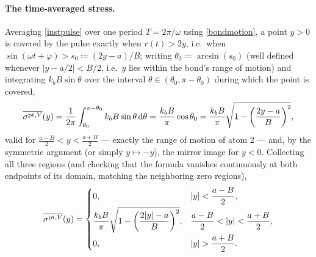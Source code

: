 \paragraph{The time-averaged stress.} Averaging \eqref{instpulse} over one period $T=2\pi/\omega$ using \eqref{bondmotion}, a point $y>0$ is covered by the pulse exactly when $r(t)>2y$, i.e.\ when $\sin(\omega t+\varphi)>s_0\coloneqq(2y-a)/B$; writing $\theta_0\coloneqq\arcsin(s_0)$ (well defined whenever $|y-a/2|<B/2$, i.e.\ $y$ lies within the bond's range of motion) and integrating $k_bB\sin\theta$ over the interval $\theta\in(\theta_0,\pi-\theta_0)$ during which the point is covered,
\begin{equation}
	\overline{\sigma^{{\rm pt},V}}(y) = \frac{1}{2\pi}\int_{\theta_0}^{\pi-\theta_0} k_bB\sin\theta\,\mathrm{d}\theta = \frac{k_bB}{\pi}\cos\theta_0 = \frac{k_bB}{\pi}\sqrt{1-\left(\frac{2y-a}{B}\right)^2},
\end{equation}
valid for $\tfrac{a-B}2<y<\tfrac{a+B}2$ --- exactly the range of motion of atom 2 --- and, by the symmetric argument (or simply $y\mapsto-y$), the mirror image for $y<0$. Collecting all three regions (and checking that the formula vanishes continuously at both endpoints of its domain, matching the neighboring zero regions),
\begin{equation}\label{avgpulse}
	\overline{\sigma^{{\rm pt},V}}(y) = \begin{cases} 0, & |y|<\dfrac{a-B}2,\\[2mm] \dfrac{k_bB}{\pi}\sqrt{1-\left(\dfrac{2|y|-a}{B}\right)^2}, & \dfrac{a-B}2<|y|<\dfrac{a+B}2,\\[3mm] 0, & |y|>\dfrac{a+B}2.\end{cases}
\end{equation}


